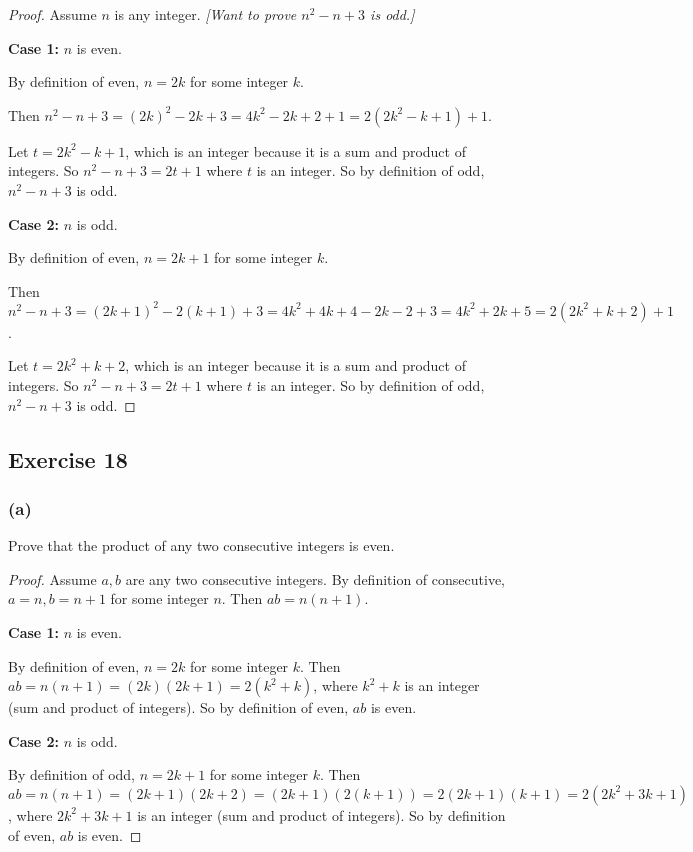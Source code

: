 \documentclass[14pt]{extarticle}
\begin{document}
\begin{proof}
    Assume $n$ is any integer. {\it [Want to prove $n^2-n + 3$ is odd.]}

        {\bf Case 1:} $n$ is even.

    By definition of even, $n = 2k$ for some integer $k$.

    Then $n^2-n + 3 = (2k)^2 - 2k + 3 = 4k^2 - 2k + 2 + 1 = 2(2k^2 - k + 1) + 1$.

    Let $t = 2k^2 - k + 1$, which is an integer because it is a sum and product of integers. So $n^2 - n + 3 = 2t+1$ where $t$ is an integer. So by definition of odd, $n^2 - n + 3$ is odd.

        {\bf Case 2:} $n$ is odd.

    By definition of even, $n = 2k + 1$ for some integer $k$.

    Then $n^2-n + 3 = (2k+1)^2 - 2(k+1) + 3 = 4k^2 + 4k + 4 - 2k - 2 + 3 = 4k^2 + 2k + 5 = 2(2k^2 + k + 2) + 1$.

    Let $t = 2k^2 + k + 2$, which is an integer because it is a sum and product of integers. So $n^2 - n + 3 = 2t+1$ where $t$ is an integer. So by definition of odd, $n^2 - n + 3$ is odd.
\end{proof}

\subsection{Exercise 18}

\subsubsection{(a)}
Prove that the product of any two consecutive integers is even.

\begin{proof}
    Assume $a,b$ are any two consecutive integers. By definition of consecutive, $a = n, b = n+1$ for some integer $n$. Then $ab = n(n+1)$.

        {\bf Case 1:} $n$ is even.

    By definition of even, $n = 2k$ for some integer $k$. Then $ab = n(n+1) = (2k)(2k+1) = 2(k^2+k)$, where $k^2+k$ is an integer (sum and product of integers). So by definition of even, $ab$ is even.

        {\bf Case 2:} $n$ is odd.

    By definition of odd, $n = 2k+1$ for some integer $k$. Then $ab = n(n+1) = (2k+1)(2k+2) = (2k+1)(2(k+1)) = 2(2k+1)(k+1) = 2(2k^2 + 3k + 1)$, where $2k^2 + 3k + 1$ is an integer (sum and product of integers). So by definition of even, $ab$ is even.
\end{proof}
\end{document}
